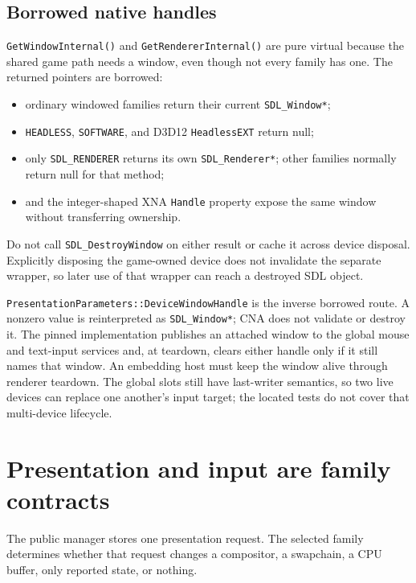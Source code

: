 \subsection{Borrowed native handles}
\label{sec:backend-native-handle-boundary}

\texttt{GetWindowInternal()} and \texttt{GetRendererInternal()} are pure virtual because the
shared game path needs a window, even though not every family has one. The returned pointers are
borrowed:

\begin{itemize}
  \item ordinary windowed families return their current \texttt{SDL\_Window*};
  \item \texttt{HEADLESS}, \texttt{SOFTWARE}, and D3D12 \texttt{HeadlessEXT} return null;
  \item only \texttt{SDL\_RENDERER} returns its own \texttt{SDL\_Renderer*}; other families
        normally return null for that method;
  \item {} and the integer-shaped XNA
        \texttt{Handle} property expose the same window without transferring ownership.
\end{itemize}

Do not call \texttt{SDL\_DestroyWindow} on either result or cache it across device disposal.
Explicitly disposing the game-owned device does not invalidate the separate
 wrapper, so later use of that wrapper can reach a destroyed SDL object.

\texttt{PresentationParameters::DeviceWindowHandle} is the inverse borrowed route. A nonzero
value is reinterpreted as \texttt{SDL\_Window*}; CNA does not validate or destroy it. The pinned
implementation publishes an attached window to the global mouse and text-input services and, at
teardown, clears either handle only if it still names that window. An embedding host must keep the
window alive through renderer teardown. The global slots still have last-writer semantics, so two
live devices can replace one another's input target; the located tests do not cover that
multi-device lifecycle.

\section{Presentation and input are family contracts}

The public manager stores one presentation request. The selected family determines whether that
request changes a compositor, a swapchain, a CPU buffer, only reported state, or nothing.

